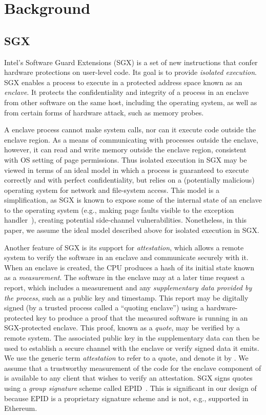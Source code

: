 \section{Background}
\subsection{SGX}
Intel's Software Guard Extensions (SGX) is a set of new instructions that confer hardware protections on user-level code. Its goal is to provide \emph{isolated execution}. SGX enables a process to execute in a protected address space known as an {\em enclave}. It protects the confidentiality and integrity of a process in an enclave from other software on the same host, including the operating system, as well as from certain forms of hardware attack, such as memory probes. 

A enclave process cannot make system calls, nor can it execute code outside the enclave region. As a means of communicating with processes outside the enclave, however, it can read and write memory outside the enclave region, consistent with OS setting of page permissions. Thus  isolated execution in SGX may be viewed in terms of an ideal model in which a process is guaranteed to execute correctly and with perfect confidentiality, but relies on a (potentially malicious) operating system for network and file-system access. This model is a simplification, as SGX is known to expose some of the internal state of an enclave to the operating system (e.g., making page faults visible to the exception handler~\cite{}), creating potential side-channel vulnerabilities. Nonetheless, in this paper, we assume the ideal model described above for isolated execution in SGX.

Another feature of SGX is its support for \emph{attestation}, which allows a remote system to verify the software in an enclave and communicate securely with it. When an enclave is created, the CPU produces a hash of its initial state known as a {\em measurement}. The software in the enclave may at a later time request a report, which includes a measurement and any {\em supplementary data provided by the process}, such as a public key and timestamp. This report may be digitally signed (by a trusted process called a ``quoting enclave'') using a hardware-protected key to produce a proof that the measured software is running in an SGX-protected enclave. This proof, known as a {\em quote}, may be verified by a remote system. The associated public key in the supplementary data can then be used to establish a secure channel with the enclave or verify signed data it emits. We use the generic term {\em attestation} to refer to a quote, and denote it by \att. We assume that a trustworthy measurement of the code for the enclave component of \tc is available to any client that wishes to verify an attestation. SGX signs quotes using a \emph{group signature} scheme called EPID~\cite{}. This is significant in our design of \tcs because EPID is a proprietary signature scheme and is not, e.g., supported in Ethereum.

